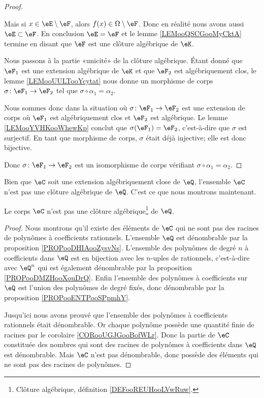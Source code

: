 \begin{proof}
\begin{subproof}
		Mais si \( x\in\eE\setminus \eF\), alors \( f(x)\in \Omega\setminus \eF\). Donc en réalité nous avons aussi \( \eE\subset \eF\).
		\spitem[Conclusion]
		En conclusion \( \eE=\eF\) et le lemme \ref{LEMooQSCGooMyCktA} termine en disant que \( \eF\) est une clôture algébrique de \( \eK\).
	\end{subproof}
	Nous passons à la partie «unicité» de la clôture algébrique. Étant donné que \( \eF_1\) est une extension algébrique de \( \eK\) et que \( \eF_2\) est algébriquement clos, le lemme \ref{LEMooUULTooYcytat} nous donne un morphisme de corps \( \sigma\colon \eF_1\to \eF_2\) tel que \( \sigma\circ \alpha_1=\alpha_2\).

	Nous sommes donc dans la situation où \( \sigma\colon \eF_1\to \eF_2\) est une extension de corps où \( \eF_1\) est algébriquement clos et \( \eF_2\) est algébrique. Le lemme \ref{LEMooYVHKooWhewKp} conclut que \( \sigma(\eF_1)=\eF_2\), c'est-à-dire que \( \sigma\) est surjectif. En tant que morphisme de corps, \( \sigma\) était déjà injective; elle est donc bijective.

	Donc \( \sigma\colon \eF_1\to \eF_2\) est un isomorphisme de corps vérifiant \( \sigma\circ \alpha_1=\alpha_2\).
\end{proof}

\begin{normaltext}
	Bien que \( \eC\) soit une extension algébriquement close de \( \eQ\), l'ensemble \( \eC\) n'est pas une clôture algébrique de \( \eQ\). C'est ce que nous montrons maintenant.
\end{normaltext}

\begin{lemma}       \label{LEMooRDIZooRjWNMa}
	Le corps \( \eC\) n'est pas une clôture algébrique\footnote{Clôture algébrique, définition \ref{DEFooREUHooLVwRuw}.} de \( \eQ\).
\end{lemma}

\begin{proof}
	Nous montrons qu'il existe des éléments de \( \eC\) qui ne sont pas des racines de polynômes à coefficients rationnels. L'ensemble \( \eQ\) est dénombrable par la proposition \ref{PROPooDHIAooZysvNs}. L'ensemble des polynômes de degré \( n\) à coefficients dans \( \eQ\) est en bijection avec les \( n\)-uples de rationnels, c'est-à-dire avec \( \eQ^n\) qui est également dénombrable par la proposition \ref{PROPooDMZHooXouDrQ}. Enfin l'ensemble des polynômes à coefficients sur \( \eQ\) est l'union des polynômes de degré fixés, donc dénombrable par la proposition \ref{PROPooENTPooSPpmhY}.

	Jusqu'ici nous avons prouvé que l'ensemble des polynômes à coefficients rationnels était dénombrable. Or chaque polynôme possède une quantité finie de racines par le corolaire \ref{CORooUGJGooBofWLr}. Donc la partie de \( \eC\) constituée des nombres qui sont des racines de polynômes à coefficients dans \( \eQ\) est dénombrable. Mais \( \eC\) n'est pas dénombrable, donc possède des éléments qui ne sont pas des racines de polynômes.
\end{proof}



